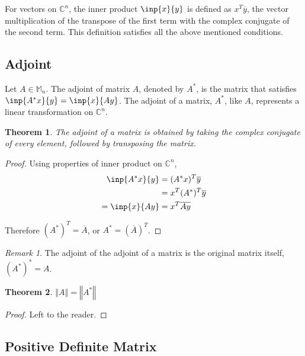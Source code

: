 \documentclass[twofold]{article}
\newcommand*\conj[1]{\overline{#1}}
\newcommand*\adj[1]{#1^*}
\newcommand*\norm[1]{\left \Vert #1 \right\Vert}
\newcommand*\trp[1]{#1^T}
\theoremstyle{plain}
\newtheorem{theorem}{Theorem}
\theoremstyle{definition}
\theoremstyle{remark}
\newtheorem*{remark}{Remark}
\begin{document}
For vectors on \(\mathbb{C}^n\), the inner product \(\inp{x}{y}\) is defined as \(\trp{x} \conj{y}\), the vector multiplication of the transpose of the first term with the complex conjugate of the second term. This definition satisfies all the above mentioned conditions.


\subsection{Adjoint}

Let \(A \in \mathbb{M}_n\). The adjoint of matrix \(A\), denoted by \(\adj{A}\), is the matrix that  satisfies \(\inp{\adj{A}x}{y} = \inp{x}{Ay}\). The adjoint of a matrix, \(\adj{A}\), like \(A\), represents a linear transformation on \(\mathbb{C}^n\).

\begin{theorem} The adjoint of a matrix is obtained by taking the complex conjugate of every element, followed by transposing the matrix. \end{theorem}

\begin{proof} Using properties of inner product on \(\mathbb{C}^n\),
\begin{equation*} \begin{split}
\inp{\adj{A}x}{y} & = \trp{(\adj{A}x)} \conj{y}  \\
& = \trp{x} \trp{(\adj{A})} \conj{y}\\
= \inp{x}{Ay} & = \trp{x} \conj{Ay} 
\end{split} \end{equation*}

Therefore \(\trp{(\adj{A})} = \conj{A}\), or \(\adj{A} = \trp{(\conj{A})}\). \end{proof}

\begin{remark} The adjoint of the adjoint of a matrix is the original matrix itself, \(\adj{(\adj{A})} = A\). \end{remark}


\begin{theorem} \(\norm{A} = \norm{\adj{A}}\) \end{theorem}
\begin{proof} Left to the reader. \end{proof}

\subsection{Positive Definite Matrix}
\end{document}

